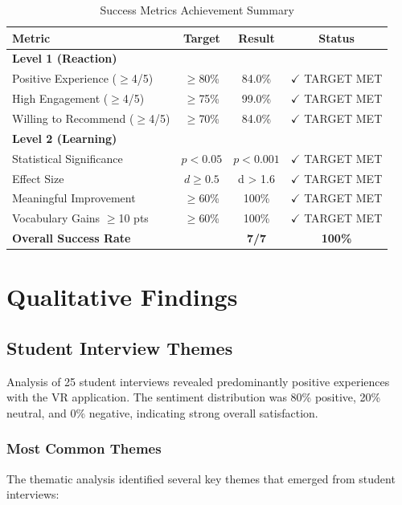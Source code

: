 \documentclass[12pt,a4paper]{article}
\begin{document}
\begin{table}[H]
\centering
\caption{Success Metrics Achievement Summary}
\label{tab:success}
\begin{tabular}{lccc}
\toprule
\textbf{Metric} & \textbf{Target} & \textbf{Result} & \textbf{Status} \\
\midrule
\textbf{Level 1 (Reaction)} & & & \\
Positive Experience ($\geq$4/5) & $\geq$80\% & 84.0\% & $\checkmark$ TARGET MET \\
High Engagement ($\geq$4/5) & $\geq$75\% & 99.0\% & $\checkmark$ TARGET MET \\
Willing to Recommend ($\geq$4/5) & $\geq$70\% & 84.0\% & $\checkmark$ TARGET MET \\
\midrule
\textbf{Level 2 (Learning)} & & & \\
Statistical Significance & $p < 0.05$ & $p < 0.001$ & $\checkmark$ TARGET MET \\
Effect Size & $d \geq 0.5$ & d > 1.6 & $\checkmark$ TARGET MET \\
Meaningful Improvement & $\geq$60\% & 100\% & $\checkmark$ TARGET MET \\
Vocabulary Gains $\geq$10 pts & $\geq$60\% & 100\% & $\checkmark$ TARGET MET \\
\midrule
\textbf{Overall Success Rate} & & \textbf{7/7} & \textbf{100\%} \\
\bottomrule
\end{tabular}
\end{table}

\section{Qualitative Findings}

\subsection{Student Interview Themes}

Analysis of 25 student interviews revealed predominantly positive experiences with the VR application. The sentiment distribution was 80\% positive, 20\% neutral, and 0\% negative, indicating strong overall satisfaction.

\subsubsection{Most Common Themes}

The thematic analysis identified several key themes that emerged from student interviews:
\end{document}
